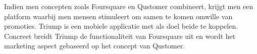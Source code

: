 Indien men concepten zoals Foursquare en Qustomer combineert, krijgt men een platform waarbij men mensen stimuleert om samen te komen omwille van promoties.
Triump is een mobiele applicatie met als doel beide te koppelen.
Concreet breidt Triump de functionaliteit van Foursquare uit en wordt het marketing aspect gebaseerd op het concept van Qustomer.


